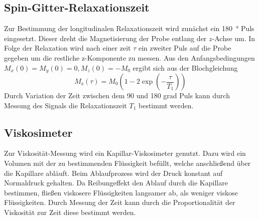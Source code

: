 \subsection{Spin-Gitter-Relaxationszeit}%
\label{sub:spin_gitter_relaxationszeit}
Zur Bestimmung der longitudinalen Relaxationszeit wird zunächst ein
\SI{180}{\degree}
Puls eingesetzt. 
Dieser dreht die Magnetisierung der Probe entlang der $z$-Achse um.
In Folge der Relaxation wird nach einer zeit $\tau$ ein zweiter Puls auf die
Probe gegeben um die restliche z-Komponente zu messen. 
Aus den Anfangsbedingungen $M_x(0) = M_y(0) =0, M_z(0)=-M_0$ ergibt sich aus der
Blochgleichung 
\begin{equation}
		\label{eq:magn}
		M_\text{z}(\tau) = M_0 \left(1 - 2 \exp \left(- \frac{\tau}{T_1} \right)
		\right)
\end{equation}
Durch Variation der Zeit zwischen dem 90 und 180 grad Puls kann durch Messung
des Signals die Relaxationszeit $T_1$ bestimmt werden.

\subsection{Viskosimeter}%
\label{sub:viskosimeter}
Zur Viskosität-Messung wird ein Kapillar-Viskosimeter genutzt. 
Dazu wird ein Volumen mit der zu bestimmenden Flüssigkeit befüllt, welche
anschließend über die Kapillare abläuft.
Beim Ablaufprozess wird der Druck konstant auf Normaldruck gehalten. 
Da Reibungeffekt den Ablauf durch die Kapillare bestimmen, fließen viskosere
Flüssigkeiten langsamer ab, als weniger viskose Flüssigkeiten.
Durch Messung der Zeit kann durch die Proportionalität der Viskosität zur Zeit
diese bestimmt werden.
